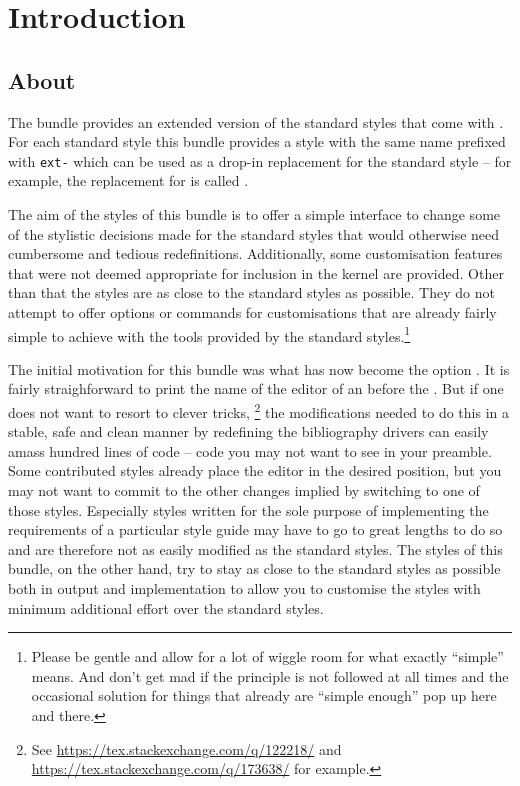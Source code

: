 \documentclass[DIV=9]{scrartcl}
\providecommand*{\printtitlepage}{}
\begin{document}
\printtitlepage
\tableofcontents

\section{Introduction}\label{sec:int}
\subsection{About}
The  bundle provides an extended version of the standard
styles that come with .
For each standard style this bundle provides a style with the same name
prefixed with \texttt{ext-} which can be used as a drop-in replacement for the
standard style -- for example, the replacement for 
is called .

The aim of the styles of this bundle is to offer a simple interface to change
some of the stylistic decisions made for the standard styles that would
otherwise need cumbersome and tedious redefinitions.
Additionally, some customisation features that were not deemed appropriate
for inclusion in the  kernel are provided.
Other than that the styles are as close to the standard styles as possible.
They do not attempt to offer options or commands for customisations that
are already fairly simple to achieve with the tools provided by the standard
styles.\footnote{Please be gentle and allow for a lot of wiggle room for what
exactly \enquote{simple} means. And don't get mad if the principle is not
followed at all times and the occasional solution for things that already are
\enquote{simple enough} pop up here and there.}

The initial motivation for this bundle was what has now become the option
.
It is fairly straighforward to print the name of the editor of an
 before the .
But if one does not want to resort to clever tricks,%
\footnote{See \url{https://tex.stackexchange.com/q/122218/} and
\url{https://tex.stackexchange.com/q/173638/} for example.}
the modifications needed to do this in a stable, safe and clean manner by
redefining the bibliography drivers can easily amass hundred lines of code --
code you may not want to see in your preamble.
Some contributed  styles already place the editor in the
desired position, but you may not want to commit to the other changes implied
by switching to one of those styles.
Especially styles written for the sole purpose of implementing the requirements
of a particular style guide may have to go to great lengths to do so and are
therefore not as easily modified as the standard styles.
The styles of this bundle, on the other hand, try to stay as close to the
standard styles as possible both in output and implementation to allow you
to customise the styles with minimum additional effort over the standard styles.
\end{document}
